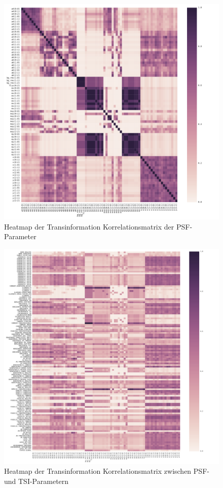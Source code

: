 \begin{appendix}
\begin{figure}[H]
	\includegraphics[scale=.58]{heatmaps/psf.pdf}
	\caption[Heatmap der Transinformation Korrelationsmatrix der PSF-Parameter]{Heatmap der Transinformation Korrelationsmatrix der PSF-Parameter}
    \label{heatmap_psf}
\end{figure}
\begin{figure}[H]
	\centering
	\includegraphics[scale=.44]{heatmaps/psf_tsi.pdf}
	\caption[Heatmap der Transinformation Korrelationsmatrix zwischen PSF- und TSI-Parametern]{Heatmap der Transinformation Korrelationsmatrix zwischen PSF- und TSI-Parametern}
    \label{heatmap_psf_tsi}
\end{figure}


\end{appendix}
